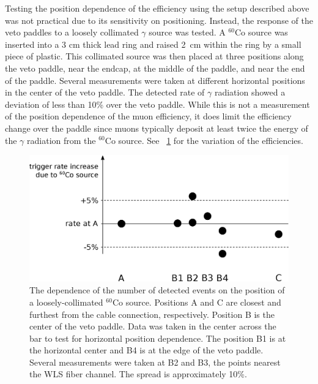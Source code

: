 Testing the position dependence of the efficiency using the setup described above was not practical due to its sensitivity on positioning.  Instead, the response of the veto paddles to a loosely collimated $\gamma$ source was tested.  A $^{60}$Co source was inserted into a 3 cm thick lead ring and raised 2~cm within the ring by a small piece of plastic.  This collimated source was then placed at three positions along the veto paddle, near the endcap, at the middle of the paddle, and near the end of the paddle.  Several measurements were taken at different horizontal positions in the center of the veto paddle. The detected rate of $\gamma$ radiation showed a deviation of less than 10\% over the veto paddle.  While this is not a measurement of the position dependence of the muon efficiency, it does limit the efficiency change over the paddle since muons typically deposit at least twice the energy of the $\gamma$ radiation from the $^{60}$Co source.  See {\fig}~\ref{fig:positionDependence} for the variation of the efficiencies.
\begin{figure}[htp]
\centering
\includegraphics[width=1.0\textwidth]{figures/efficiency_positionDependence.eps}
\caption{The dependence of the number of detected events on the position of a loosely-collimated $^{60}$Co source.  Positions A and C are closest and furthest from the cable connection, respectively.  Position B is the center of the veto paddle.  Data was taken in the center across the bar to test for horizontal position dependence.  The position B1 is at the horizontal center and B4 is at the edge of the veto paddle.  Several measurements were taken at B2 and B3, the points nearest the WLS fiber channel.  The spread is approximately 10\%.}
\label{fig:positionDependence}
\end{figure}


